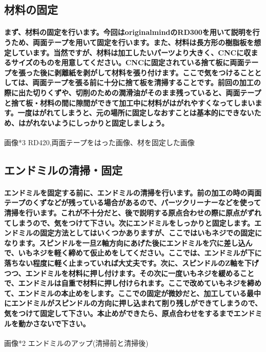 \documentclass[b5paper, 9pt, twocolumn, titlepage,openany]{jsbook}%
\begin{document}
\subsection{材料の固定}
\paragraph{まず、材料の固定を行います。今回はoriginalmindのRD300を用いて説明を行うため、両面テープを用いて固定を行います。また、材料は長方形の樹脂板を想定しています。当然ですが、材料は加工したいパーツより大きく、CNCに収まるサイズのものを用意してください。CNCに固定されている捨て板に両面テープを張った後に剥離紙を剥がして材料を張り付けます。ここで気をつけることとしては、両面テープを張る前に十分に捨て板を清掃することです。前回の加工の際に出た切りくずや、切削のための潤滑油がそのまま残っていると、両面テープと捨て板・材料の間に隙間ができて加工中に材料がはがれやすくなってしまいます。一度はがれてしまうと、元の場所に固定しなおすことは基本的にできないため、はがれないようにしっかりと固定しましょう。}

画像*3 RD420,両面テープをはった画像、材を固定した画像

\subsection{エンドミルの清掃・固定}
\paragraph{エンドミルを固定する前に、エンドミルの清掃を行います。前の加工の時の両面テープのくずなどが残っている場合があるので、パーツクリーナーなどを使って清掃を行います。これが不十分だと、後で説明する原点合わせの際に原点がずれてしまうので、気をつけて下さい。次にエンドミルをしっかりと固定します。エンドミルの固定方法としてはいくつかありますが、ここではいもネジでの固定になります。スピンドルを一旦Z軸方向にあげた後にエンドミルを穴に差し込んで、いもネジを軽く締めて仮止めをしてください。ここでは、エンドミルが下に落ちない程度に軽く止まっていれば大丈夫です。次に、スピンドルのZ軸を下げつつ、エンドミルを材料に押し付けます。その次に一度いもネジを緩めることで、エンドミルは自重で材料に押し付けられます。ここで改めていもネジを締めて、エンドミルの本止めをします。ここでの固定が微妙だと、加工している最中にエンドミルがスピンドルの方向に押し込まれて削り残しができてしまうので、気をつけて固定して下さい。本止めができたら、原点合わせをするまでエンドミルを動かさないで下さい。}

画像*2 エンドミルのアップ(清掃前と清掃後)
\end{document}
